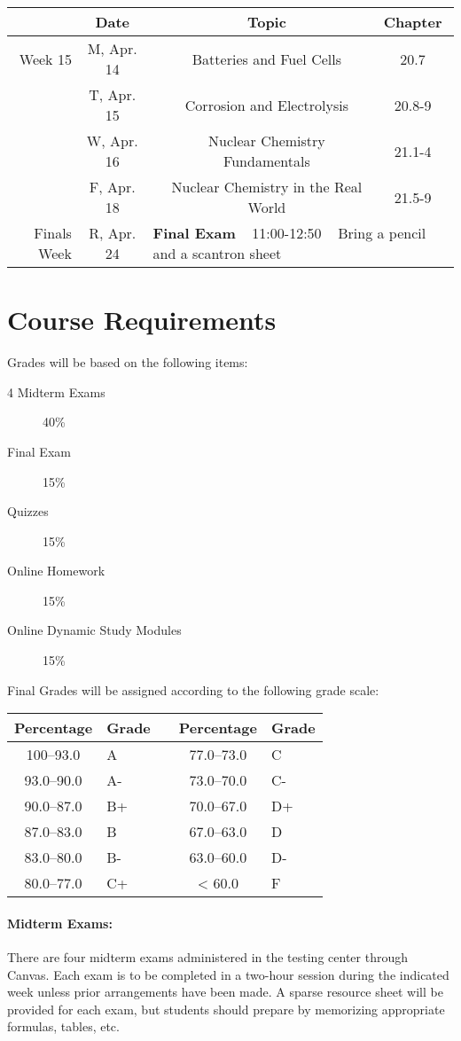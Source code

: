\documentclass[12pt, letterpaper]{article}
\begin{document}
\begin{tabular}{rcccc}
& Date && Topic & Chapter\\
\midrule
Week 15 & M, Apr. 14&& Batteries and Fuel Cells & 20.7\\
& T, Apr. 15&& Corrosion and Electrolysis & 20.8-9\\
& W, Apr. 16&& Nuclear Chemistry Fundamentals & 21.1-4\\
& F, Apr. 18&& Nuclear Chemistry in the Real World & 21.5-9\\
\midrule
\midrule
Finals Week & R, Apr. 24 & \multicolumn{3}{l}{\textbf{Final Exam} ~ 11:00-12:50 ~ Bring a pencil and a scantron sheet}\\
\end{tabular}

\section*{Course Requirements}
Grades will be based on the following items:
\begin{description}
	\item[4 Midterm Exams] 40\%
	\item[Final Exam] 15\%
	\item[Quizzes] 15\%
	\item[Online Homework] 15\%
	\item[Online Dynamic Study Modules] 15\%
\end{description}
Final Grades will be assigned according to the following grade scale:

\begin{tabular}{cl|c|cl}
	Percentage & Grade &  & Percentage & Grade \\ \midrule
	100--93.0  & A     &  & 77.0--73.0 & C     \\
	93.0--90.0 & A-    &  & 73.0--70.0 & C-    \\
	90.0--87.0 & B+    &  & 70.0--67.0 & D+    \\
	87.0--83.0 & B     &  & 67.0--63.0 & D     \\
	83.0--80.0 & B-    &  & 63.0--60.0 & D-    \\
	80.0--77.0 & C+    &  & < 60.0     & F
\end{tabular}

\paragraph{Midterm Exams:}
There are four midterm exams administered in the testing center through Canvas. Each exam is to be completed in a two-hour session during the indicated week unless prior arrangements have been made. A sparse resource sheet will be provided for each exam, but students should prepare by memorizing appropriate formulas, tables, etc.
\end{document}
